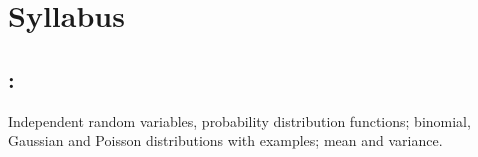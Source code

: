 \section*{Syllabus}

    \subsection*{\topicSubTitle: \topicTitle}
        Independent random variables, probability distribution functions; binomial, Gaussian and Poisson distributions with examples; mean and variance.